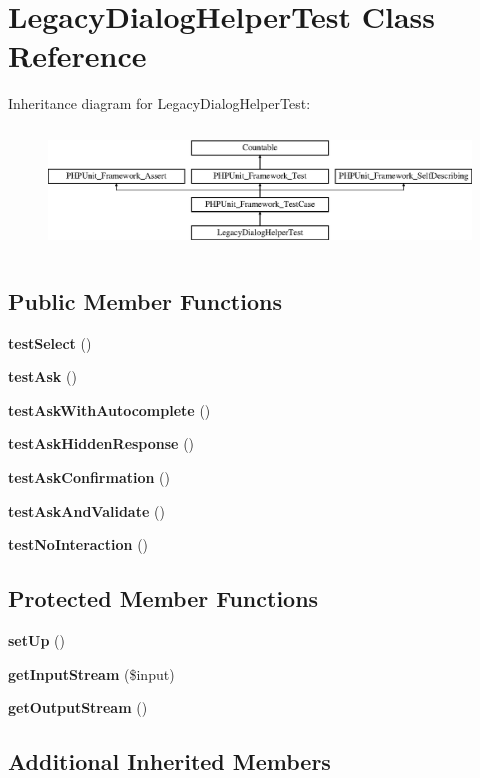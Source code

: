 \section{Legacy\+Dialog\+Helper\+Test Class Reference}
\label{class_symfony_1_1_component_1_1_console_1_1_tests_1_1_helper_1_1_legacy_dialog_helper_test}
Inheritance diagram for Legacy\+Dialog\+Helper\+Test\+:\begin{figure}[H]
\begin{center}
\leavevmode
\includegraphics[height=3.303835cm]{class_symfony_1_1_component_1_1_console_1_1_tests_1_1_helper_1_1_legacy_dialog_helper_test}
\end{center}
\end{figure}
\subsection*{Public Member Functions}
\begin{DoxyCompactItemize}
\item 
{\bf test\+Select} ()
\item 
{\bf test\+Ask} ()
\item 
{\bf test\+Ask\+With\+Autocomplete} ()
\item 
{\bf test\+Ask\+Hidden\+Response} ()
\item 
{\bf test\+Ask\+Confirmation} ()
\item 
{\bf test\+Ask\+And\+Validate} ()
\item 
{\bf test\+No\+Interaction} ()
\end{DoxyCompactItemize}
\subsection*{Protected Member Functions}
\begin{DoxyCompactItemize}
\item 
{\bf set\+Up} ()
\item 
{\bf get\+Input\+Stream} (\$input)
\item 
{\bf get\+Output\+Stream} ()
\end{DoxyCompactItemize}
\subsection*{Additional Inherited Members}


